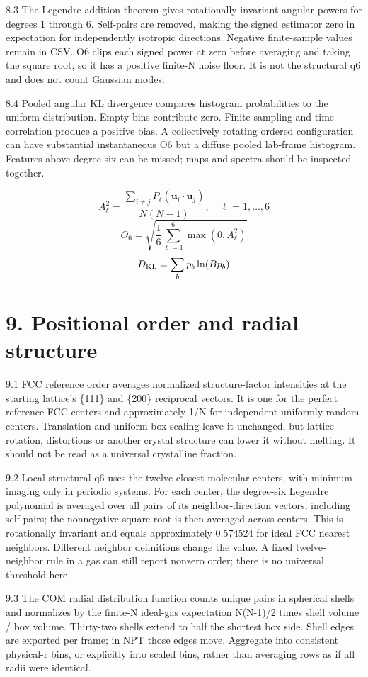 \documentclass[11pt]{article}
\begin{document}
8.3 The Legendre addition theorem gives rotationally invariant angular powers for degrees 1 through 6. Self-pairs are removed, making the signed estimator zero in expectation for independently isotropic directions. Negative finite-sample values remain in CSV. O6 clips each signed power at zero before averaging and taking the square root, so it has a positive finite-N noise floor. It is not the structural q6 and does not count Gaussian modes.


8.4 Pooled angular KL divergence compares histogram probabilities to the uniform distribution. Empty bins contribute zero. Finite sampling and time correlation produce a positive bias. A collectively rotating ordered configuration can have substantial instantaneous O6 but a diffuse pooled lab-frame histogram. Features above degree six can be missed; maps and spectra should be inspected together.


\[A_\ell^2=\frac{\sum_{i\ne j}P_\ell(\mathbf{u}_i\cdot\mathbf{u}_j)}{N(N-1)},\quad\ell=1,\ldots,6\]
\[O_6=\sqrt{\frac{1}{6}\sum_{\ell=1}^6\max(0,A_\ell^2)}\]
\[D_{\rm KL}=\sum_b p_b\ln(Bp_b)\]
\section*{9. Positional order and radial structure}
9.1 FCC reference order averages normalized structure-factor intensities at the starting lattice's \{111\} and \{200\} reciprocal vectors. It is one for the perfect reference FCC centers and approximately 1/N for independent uniformly random centers. Translation and uniform box scaling leave it unchanged, but lattice rotation, distortions or another crystal structure can lower it without melting. It should not be read as a universal crystalline fraction.


9.2 Local structural q6 uses the twelve closest molecular centers, with minimum imaging only in periodic systems. For each center, the degree-six Legendre polynomial is averaged over all pairs of its neighbor-direction vectors, including self-pairs; the nonnegative square root is then averaged across centers. This is rotationally invariant and equals approximately 0.574524 for ideal FCC nearest neighbors. Different neighbor definitions change the value. A fixed twelve-neighbor rule in a gas can still report nonzero order; there is no universal threshold here.


9.3 The COM radial distribution function counts unique pairs in spherical shells and normalizes by the finite-N ideal-gas expectation N(N-1)/2 times shell volume / box volume. Thirty-two shells extend to half the shortest box side. Shell edges are exported per frame; in NPT those edges move. Aggregate into consistent physical-r bins, or explicitly into scaled bins, rather than averaging rows as if all radii were identical.
\end{document}
